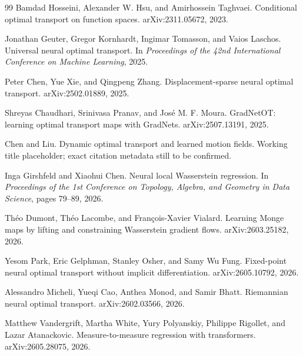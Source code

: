 \documentclass[11pt]{report}
\begin{document}
\begin{thebibliography}{99}
Bamdad Hosseini, Alexander W. Hsu, and Amirhossein Taghvaei.
\newblock Conditional optimal transport on function spaces.
\newblock arXiv:2311.05672, 2023.

Jonathan Geuter, Gregor Kornhardt, Ingimar Tomasson, and Vaios Laschos.
\newblock Universal neural optimal transport.
\newblock In \emph{Proceedings of the 42nd International Conference on Machine Learning}, 2025.

Peter Chen, Yue Xie, and Qingpeng Zhang.
\newblock Displacement-sparse neural optimal transport.
\newblock arXiv:2502.01889, 2025.

Shreyas Chaudhari, Srinivasa Pranav, and Jos\'e M. F. Moura.
\newblock GradNetOT: learning optimal transport maps with GradNets.
\newblock arXiv:2507.13191, 2025.

Chen and Liu.
\newblock Dynamic optimal transport and learned motion fields.
\newblock Working title placeholder; exact citation metadata still to be confirmed.

Inga Girshfeld and Xiaohui Chen.
\newblock Neural local Wasserstein regression.
\newblock In \emph{Proceedings of the 1st Conference on Topology, Algebra, and Geometry in Data Science}, pages 79--89, 2026.

Th\'eo Dumont, Th\'eo Lacombe, and Fran\c{c}ois-Xavier Vialard.
\newblock Learning Monge maps by lifting and constraining Wasserstein gradient flows.
\newblock arXiv:2603.25182, 2026.

Yesom Park, Eric Gelphman, Stanley Osher, and Samy Wu Fung.
\newblock Fixed-point neural optimal transport without implicit differentiation.
\newblock arXiv:2605.10792, 2026.

Alessandro Micheli, Yueqi Cao, Anthea Monod, and Samir Bhatt.
\newblock Riemannian neural optimal transport.
\newblock arXiv:2602.03566, 2026.

Matthew Vandergrift, Martha White, Yury Polyanskiy, Philippe Rigollet, and Lazar Atanackovic.
\newblock Measure-to-measure regression with transformers.
\newblock arXiv:2605.28075, 2026.

\end{thebibliography}
\end{document}
